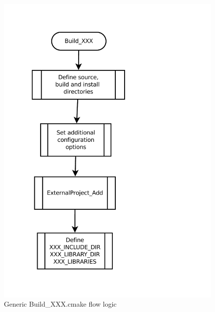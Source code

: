 \documentclass[12pt]{article}
\begin{document}
\begin{figure}
\begin{center}
\includegraphics[scale=0.5]{figures/Build_XXX.pdf}
\end{center}
\caption{Generic Build\_XXX.cmake flow logic}
\end{figure}




 
   
\end{document}
